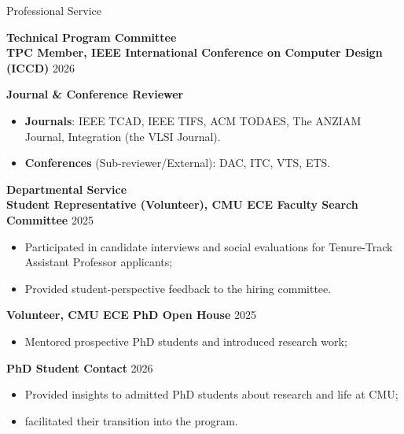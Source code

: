     \begin{rSection}{Professional Service}

        {\bf \textcolor{CUHKblue}{Technical Program Committee}} \\
        {\bf {TPC Member, IEEE International Conference on Computer Design (ICCD)}} \hfill{2026}

        {\bf \textcolor{CUHKblue}{Journal \& Conference Reviewer}}               
        \begin{itemize}[noitemsep,topsep=-5pt]
            \item \textbf{Journals}: IEEE TCAD, IEEE TIFS, ACM TODAES, The ANZIAM Journal, Integration (the VLSI Journal).
            \item \textbf{Conferences} (Sub-reviewer/External): DAC, ITC, VTS, ETS.
        \end{itemize}
        {\bf \textcolor{CUHKblue}{Departmental Service}} \\
        {\bf {Student Representative (Volunteer), CMU ECE Faculty Search Committee} }              \hfill{2025} 
        \begin{itemize}[noitemsep,topsep=-5pt]
            \item Participated in candidate interviews and social evaluations for Tenure-Track Assistant Professor applicants; 
            \item Provided student-perspective feedback to the hiring committee.
        \end{itemize}
        {\bf {Volunteer, CMU ECE PhD Open House} }              \hfill{2025} 
        \begin{itemize}[noitemsep,topsep=-5pt]
            \item Mentored prospective PhD students and introduced research work;
        \end{itemize}
        {\bf {PhD Student Contact} }              \hfill{2026} 
        \begin{itemize}[noitemsep,topsep=-5pt]
            \item Provided insights to admitted PhD students about research and life at CMU;
            \item facilitated their transition into the program.
        \end{itemize}
\end{rSection}


